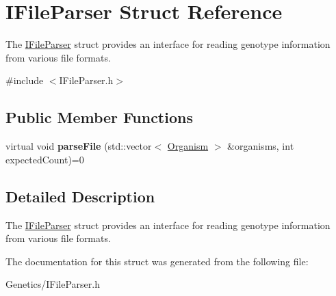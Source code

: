 \hypertarget{struct_i_file_parser}{}\section{I\+File\+Parser Struct Reference}
\label{struct_i_file_parser}


The \hyperlink{struct_i_file_parser}{I\+File\+Parser} struct provides an interface for reading genotype information from various file formats.  




{\ttfamily \#include $<$I\+File\+Parser.\+h$>$}

\subsection*{Public Member Functions}
\begin{DoxyCompactItemize}
\item 
virtual void {\bfseries parse\+File} (std\+::vector$<$ \hyperlink{class_organism}{Organism} $>$ \&organisms, int expected\+Count)=0\hypertarget{struct_i_file_parser_ace1ade2e3d05dfdeb1ea67796d271fdd}{}\label{struct_i_file_parser_ace1ade2e3d05dfdeb1ea67796d271fdd}

\end{DoxyCompactItemize}


\subsection{Detailed Description}
The \hyperlink{struct_i_file_parser}{I\+File\+Parser} struct provides an interface for reading genotype information from various file formats. 

The documentation for this struct was generated from the following file\+:\begin{DoxyCompactItemize}
\item 
Genetics/I\+File\+Parser.\+h\end{DoxyCompactItemize}
